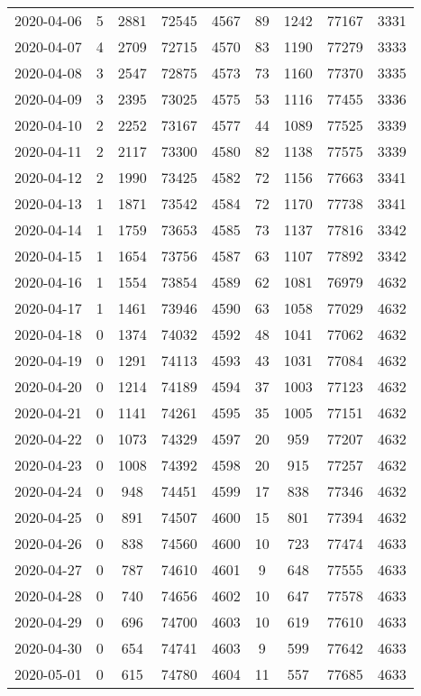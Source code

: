 \begin{longtable}{ccccccccc}
2020-04-06&5&2881&72545&4567&89&1242&77167&3331\\
2020-04-07&4&2709&72715&4570&83&1190&77279&3333\\
2020-04-08&3&2547&72875&4573&73&1160&77370&3335\\
2020-04-09&3&2395&73025&4575&53&1116&77455&3336\\
2020-04-10&2&2252&73167&4577&44&1089&77525&3339\\
2020-04-11&2&2117&73300&4580&82&1138&77575&3339\\
2020-04-12&2&1990&73425&4582&72&1156&77663&3341\\
2020-04-13&1&1871&73542&4584&72&1170&77738&3341\\
2020-04-14&1&1759&73653&4585&73&1137&77816&3342\\
2020-04-15&1&1654&73756&4587&63&1107&77892&3342\\
2020-04-16&1&1554&73854&4589&62&1081&76979&4632\\
2020-04-17&1&1461&73946&4590&63&1058&77029&4632\\
2020-04-18&0&1374&74032&4592&48&1041&77062&4632\\
2020-04-19&0&1291&74113&4593&43&1031&77084&4632\\
2020-04-20&0&1214&74189&4594&37&1003&77123&4632\\
2020-04-21&0&1141&74261&4595&35&1005&77151&4632\\
2020-04-22&0&1073&74329&4597&20&959&77207&4632\\
2020-04-23&0&1008&74392&4598&20&915&77257&4632\\
2020-04-24&0&948&74451&4599&17&838&77346&4632\\
2020-04-25&0&891&74507&4600&15&801&77394&4632\\
2020-04-26&0&838&74560&4600&10&723&77474&4633\\
2020-04-27&0&787&74610&4601&9&648&77555&4633\\
2020-04-28&0&740&74656&4602&10&647&77578&4633\\
2020-04-29&0&696&74700&4603&10&619&77610&4633\\
2020-04-30&0&654&74741&4603&9&599&77642&4633\\
2020-05-01&0&615&74780&4604&11&557&77685&4633\\
\hline
\end{longtable}